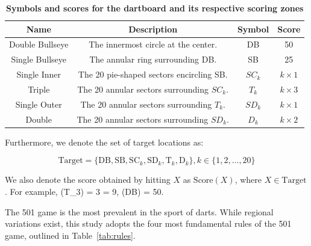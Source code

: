\documentclass[cjjs]{ipart}
\theoremstyle{plain}
\begin{document}
\begin{table}[h]
    \centering
    \begin{tabular}{|c|c|c|c|}
        \hline
        Name & Description & Symbol & Score \\
        \hline
        Double Bullseye & The innermost circle at the center. & DB & 50 \\
        \hline
        Single Bullseye & The annular ring surrounding DB. & SB & 25 \\
        \hline
        Single Inner & The 20 pie-shaped sectors encircling SB. & \( SC_k \) & \( k \times 1 \) \\
        \hline
        Triple & The 20 annular sectors surrounding \( SC_k \). & \( T_k \) & \( k \times 3 \) \\
        \hline
        Single Outer & The 20 annular sectors surrounding \( T_k \). & \( SD_k \) & \( k \times 1 \) \\
        \hline
        Double & The 20 annular sectors surrounding \( SD_k \). & \( D_k \) & \( k \times 2 \) \\
        \hline
    \end{tabular}
    \caption{\textbf{Symbols and scores for the dartboard and its respective scoring zones}}
\end{table}

Furthermore, we denote the set of target locations as:

\[
\text{Target} = \{ \text{DB}, \text{SB}, \text{SC}_k, \text{SD}_k, \text{T}_k, \text{D}_k \}, k \in \{1, 2, \dots, 20\}
\]


We also denote the score obtained by hitting \( X \) as \( \text{Score}(X) \), where \( X \in \text{Target} \).  
For example, 
(T_3) = 3  = 9, \quad {}(DB) = 50.

The 501 game is the most prevalent in the sport of darts. While regional variations exist, this study adopts the four most fundamental rules of the 501 game, outlined in Table~\ref{tab:rules}.
\end{document}
